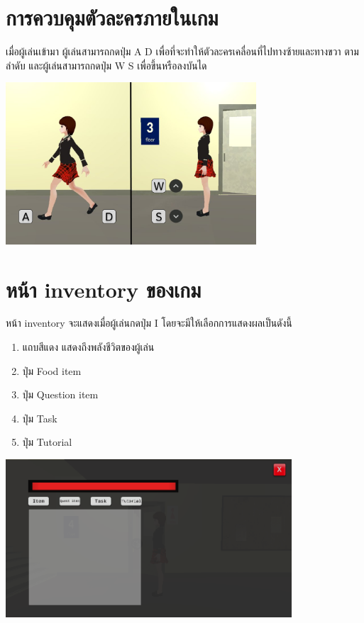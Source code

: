 \section*{การควบคุมตัวละครภายในเกม}
เมื่อผู้เล่นเข้ามา ผู้เล่นสามารถกดปุ่ม A D เพื่อที่จะทำให้ตัวละครเคลื่อนที่ไปทางซ้ายและทางขวา ตามลำดับ และผู้เล่นสามารถกดปุ่ม W S เพื่อขึ้นหรือลงบันได
\begin{center}
    \includegraphics[width=0.7\textwidth, height=0.25\textheight]{Images/tutorial_move.png}
\end{center}

\section*{หน้า inventory ของเกม}
หน้า inventory จะแสดงเมื่อผู้เล่นกดปุ่ม I โดยจะมีให้เลือกการแสดงผลเป็นดังนี้
    \begin{enumerate}
        \item แถบสีแดง แสดงถึงพลังชีวิตของผู้เล่น
        \item ปุ่ม Food item
        \item ปุ่ม Question item
        \item ปุ่ม Task
        \item ปุ่ม Tutorial
    \end{enumerate}
    \begin{center}
        \includegraphics[width=0.8\textwidth, height=0.25\textheight]{Images/Inventory Image.png}
    \end{center}
